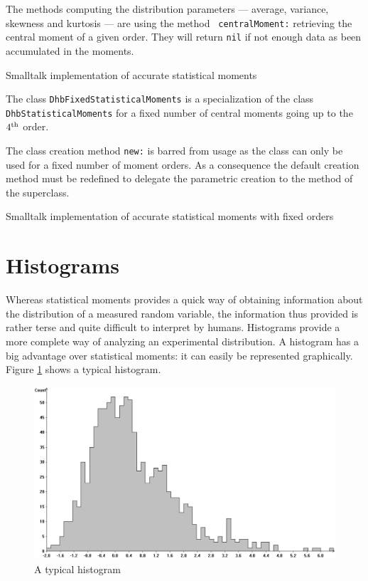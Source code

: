 The methods computing the distribution parameters --- average,
variance, skewness and kurtosis --- are using the method {\tt
centralMoment:} retrieving the central moment of a given order.
They will return {\tt nil} if not enough data as been accumulated
in the moments.

\begin{listing} Smalltalk implementation of accurate statistical moments \label{ls:genmoments}

\end{listing}

The class {\tt DhbFixedStatisticalMoments} is a specialization of
the class {\tt DhbStatisticalMoments} for a fixed number of
central moments going up to the $4^{\mathop{\textrm{th}}}$ order.

The class creation method {\tt new:} is barred from usage as the
class can only be used for a fixed number of moment orders. As a
consequence the default creation method must be redefined to
delegate the parametric creation to the method of the superclass.

\begin{listing} Smalltalk implementation of accurate statistical moments with fixed orders \label{ls:fixedmoments}

\end{listing}

\section{Histograms}
\label{sec:histogram} Whereas statistical moments provides a quick
way of obtaining information about the distribution of a measured
random variable, the information thus provided is rather terse and
quite difficult to interpret by humans. Histograms provide a more
complete way of analyzing an experimental distribution. A
histogram has a big advantage over statistical moments: it can
easily be represented graphically. Figure \ref{fig:histogram}
shows a typical histogram.
\begin{figure}
\centering\includegraphics[width=12cm]{Figures/Histogram}
\caption{A typical histogram}\label{fig:histogram}
\end{figure}

